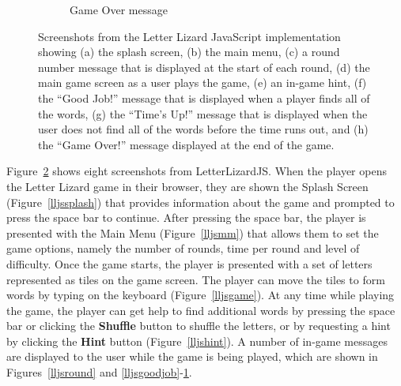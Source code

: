 \begin{figure}
\begin{subfigure}{0.49\textwidth}
        \caption{Game Over message}
        \label{lljsgameover}
    \end{subfigure}
    \caption[Screenshots from the Letter Lizard JavaScript implementation]
    {Screenshots from the Letter Lizard JavaScript implementation showing
    (a) the splash screen, (b) the main menu, (c) a round number message that is 
    displayed at the start of each round, (d) the main game screen as a user plays
    the game, (e) an in-game hint, (f) the ``Good Job!'' message that is displayed when
    a player finds all of the words, (g) the ``Time's Up!'' message that is displayed
    when the user does not find all of the words before the time runs out, and (h)
    the ``Game Over!'' message displayed at the end of the game.}
    \label{lljsscreenshots}
\end{figure}

Figure~\ref{lljsscreenshots} shows eight screenshots from LetterLizardJS. When the player
opens the Letter Lizard game in their browser, they are shown the Splash Screen
(Figure~\ref{lljssplash}) that provides information about the game and prompted to
press the space bar to continue. After pressing the space bar, the player is presented
with the Main Menu (Figure~\ref{lljsmm}) that allows them to set the game options, namely
the number of rounds, time per round and level of difficulty. Once the game starts,
the player is presented with a set of letters represented as tiles on the game screen.
The player can move the tiles to form words by typing on the keyboard (Figure~\ref{lljsgame}).
At any time while playing the game, the player can get help to find additional words
by pressing the space bar or clicking the \textbf{Shuffle} button to shuffle the letters,
or by requesting a hint by clicking the \textbf{Hint} button (Figure~\ref{lljshint}).
A number of in-game messages are displayed to the user while the game is being played,
which are shown in Figures~\ref{lljsround} and \ref{lljsgoodjob}-\ref{lljsgameover}.

